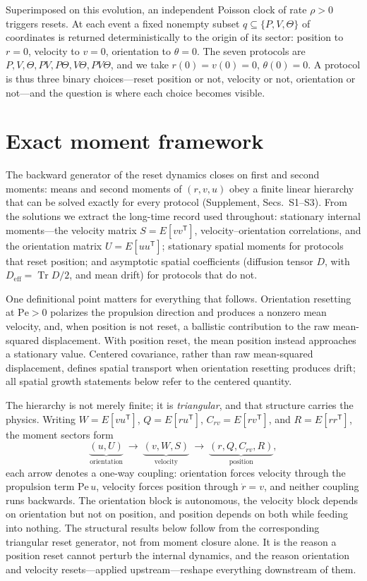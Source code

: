 Superimposed on this evolution, an independent Poisson clock of rate $\rho>0$ triggers resets. At each event a fixed nonempty subset $q\subseteq\{P,V,\Theta\}$ of coordinates is returned deterministically to the origin of its sector: position to $r=0$, velocity to $v=0$, orientation to $\theta=0$. The seven protocols are $P,V,\Theta,PV,P\Theta,V\Theta,PV\Theta$, and we take $r(0)=v(0)=0$, $\theta(0)=0$. A protocol is thus three binary choices---reset position or not, velocity or not, orientation or not---and the question is where each choice becomes visible.

\section{Exact moment framework}\label{moment-framework}

The backward generator of the reset dynamics closes on first and second moments: means and second moments of $(r,v,u)$ obey a finite linear hierarchy that can be solved exactly for every protocol (Supplement, Secs.~S1--S3). From the solutions we extract the long-time record used throughout: stationary internal moments---the velocity matrix $S=E[vv^{\mathsf T}]$, velocity--orientation correlations, and the orientation matrix $U=E[uu^{\mathsf T}]$; stationary spatial moments for protocols that reset position; and asymptotic spatial coefficients (diffusion tensor $D$, with $D_{\mathrm{eff}}=\operatorname{Tr}D/2$, and mean drift) for protocols that do not.

One definitional point matters for everything that follows. Orientation resetting at $\mathrm{Pe}>0$ polarizes the propulsion direction and produces a nonzero mean velocity, and, when position is not reset, a ballistic contribution to the raw mean-squared displacement. With position reset, the mean position instead approaches a stationary value. Centered covariance, rather than raw mean-squared displacement, defines spatial transport when orientation resetting produces drift; all spatial growth statements below refer to the centered quantity.

The hierarchy is not merely finite; it is \emph{triangular}, and that structure carries the physics. Writing $W=E[vu^\mathsf T]$, $Q=E[ru^\mathsf T]$, $C_{rv}=E[rv^\mathsf T]$, and $R=E[rr^\mathsf T]$, the moment sectors form
\[
\underbrace{(u,U)}_{\text{orientation}}\ \longrightarrow\
\underbrace{(v,W,S)}_{\text{velocity}}\ \longrightarrow\
\underbrace{(r,Q,C_{rv},R)}_{\text{position}},
\]
each arrow denotes a one-way coupling: orientation forces velocity through the propulsion term $\mathrm{Pe}\,u$, velocity forces position through $\dot r=v$, and neither coupling runs backwards. The orientation block is autonomous, the velocity block depends on orientation but not on position, and position depends on both while feeding into nothing. The structural results below follow from the corresponding triangular reset generator, not from moment closure alone. It is the reason a position reset cannot perturb the internal dynamics, and the reason orientation and velocity resets---applied upstream---reshape everything downstream of them.

